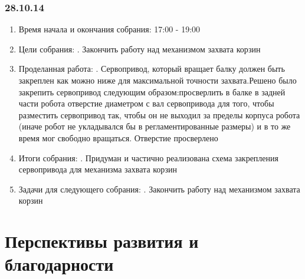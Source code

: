 \documentclass[12pt]{article}
\begin{document}
	          \subsubsection{28.10.14}
	          \begin{enumerate}
	          	\item Время начала и окончания собрания:
	          	17:00 - 19:00
	          	\newline
	          	\item Цели собрания:
	          	. Закончить работу над механизмом захвата корзин
	          	\item Проделанная работа:
	          	. Сервопривод, который вращает балку должен быть закреплен как можно ниже для максимальной точности захвата.Решено было закрепить сервопривод следующим образом:просверлить в балке в задней части робота отверстие диаметром с вал сервопривода для того, чтобы разместить сервопривод так, чтобы он не выходил за пределы корпуса робота (иначе робот не укладывался бы в регламентированные размеры) и в то же время мог свободно вращаться. Отверстие просверлено
	          	\item Итоги собрания:
	          	. Придуман и частично реализована схема закрепления сервопривода для механизма захвата корзин
	          	\item Задачи для следующего собрания:
	          	. Закончить работу над механизмом захвата корзин
	          \end{enumerate}
	          \newpage
	   \section{Перспективы развития и благодарности}

	   
	   
\end{document}
